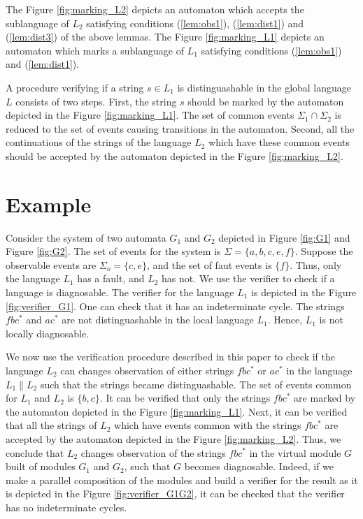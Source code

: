 \documentclass[a4paper, 10pt, conference]{ieeeconf}
\begin{document}
The Figure \ref{fig:marking_L2} depicts an automaton which
accepts the sublanguage of $L_2$ satisfying conditions (\ref{lem:obs1}),
(\ref{lem:dist1}) and (\ref{lem:dist3}) of the above lemmas.
The Figure \ref{fig:marking_L1} depicts an automaton which
marks a sublanguage of $L_1$ satisfying conditions (\ref{lem:obs1}) and
(\ref{lem:dist1}). 

A procedure verifying if a string $s \in L_1$ is distinguashable in the global
language $L$ consists of two steps. First, the string $s$ should be marked by
the automaton depicted in the Figure \ref{fig:marking_L1}. The set of common
events $\Sigma_1 \cap \Sigma_2$ is reduced to the set of events causing
transitions in the automaton. Second, all the continuations of the strings of
the language $L_2$ which have these common events should be accepted by the
automaton depicted in the Figure
\ref{fig:marking_L2}.

\section{Example}
\label{sec:Example}

Consider the system of two automata $G_1$ and $G_2$ depicted in Figure
\ref{fig:G1} and Figure \ref{fig:G2}. The set of events for the system is
$\Sigma = \{a, b, c, e, f\}$. Suppose the observable events are $\Sigma_o = \{c,
e\}$, and the set of faut events is $\{f\}$. Thus, only the language $L_1$ has a
fault, and $L_2$ has not. We use the verifier \cite{yoo_polynomial-time_2002} to
check if a language is diagnosable. The verifier for the language $L_1$ is
depicted in the Figure \ref{fig:verifier_G1}. One can check that it has an
indeterminate cycle.
The strings $fbc^*$ and $ac^*$ are not distinguashable in the local language
$L_1$. Hence, $L_1$ is not locally diagnosable.

We now use the verification procedure described in this paper to check if the
language $L_2$ can changes observation of either strings $fbc^*$ or
$ac^*$ in the language $L_1 \parallel L_2$ such that the strings became
distinguashable. The set of events common for $L_1$ and $L_2$ is $\{b, c\}$. It
can be verified that only the strings $fbc^*$ are marked by the automaton
depicted in the Figure \ref{fig:marking_L1}. Next, it can be verified that all
the strings of $L_2$ which have events common with the strings $fbc^*$ are
accepted by the automaton depicted in the Figure \ref{fig:marking_L2}. Thus, we
conclude that $L_2$ changes observation of the strings $fbc^*$ in the virtual
module $G$ built of modules $G_1$ and $G_2$, such that $G$ becomes diagnosable.
Indeed, if we make a parallel composition of the modules and build a verifier
for the result as it is depicted in the Figure \ref{fig:verifier_G1G2}, it can
be checked that the verifier has no indeterminate cycles.
\end{document}
